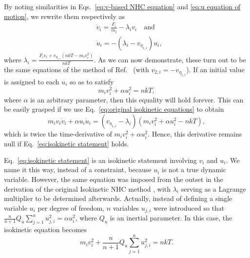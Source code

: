 \documentclass[
aip,
jcp,
reprint,
]{revtex4-1}
\newcommand{\nn}{n}
\begin{document}
By noting similarities in Eqs.~\eqref{eq:v-based NHC equation} and \eqref{eq:u equation of motion}, we rewrite them respectively as
\begin{subequations}
\label{eq:original isokinetic equations}
\begin{align}
&\dot{v}_i = \frac{F_i}{m_i} - \lambda_i v_i \quad \mathrm{and} \\
&\dot{u}_i = -(\lambda_i - v_{\eta_{1,i}}) u_i,
\end{align}
\end{subequations}
where $\lambda_i = \frac{F_i v_i + v_{\eta_{1,i}} (\nn k T - m_i v_i^2)}{\nn k T}$.
%
As we can now demonstrate, these turn out to be the same equations of the method of Ref.~ (with $v_{2,i} = -v_{\eta_{1,i}}$).
If an initial value is assigned to each $u_i$ so as to satisfy
\begin{equation}
\label{eq:isokinetic statement}
m_i v_i^2 + \alpha u_i^2 = \nn kT,
\end{equation}
where $\alpha$ is an arbitrary parameter, then this equality will hold forever.
This can be easily grasped if we use Eq.~\eqref{eq:original isokinetic equations} to obtain
\begin{equation*}
m_i v_i \dot{v}_i + \alpha u_i \dot{u}_i = (v_{\eta_{1,i}} - \lambda_i)(m_i v_i^2 + \alpha u_i^2 - \nn k T),
\end{equation*}
which is twice the time-derivative of $m_i v_i^2 + \alpha u_i^2$.
Hence, this derivative remains null if Eq.~\eqref{eq:isokinetic statement} holds.

Eq.~\eqref{eq:isokinetic statement} is an isokinetic statement involving $v_i$ and $u_i$.
We name it this way, instead of a constraint, because $u_i$ is not a true dynamic variable.
However, the same equation was imposed from the outset in the derivation of the original Isokinetic NHC method \cite{Minary_2004}, with $\lambda_i$ serving as a Lagrange multiplier to be determined afterwards.
Actually, instead of defining a single variable $u_i$ per degree of freedom, $\nn$ variables $u_{j, i}$ were introduced so that $\frac{\nn}{\nn+1} Q_u \sum_{j=1}^\nn u_{j, i}^2 = \alpha u_i^2$, where $Q_u$ is an inertial parameter.
In this case, the isokinetic equation becomes
\begin{equation}
m_i v_i^2 + \frac{\nn}{\nn+1} Q_u \sum_{j=1}^\nn u_{j, i}^2 = \nn kT.
\end{equation}
\end{document}
